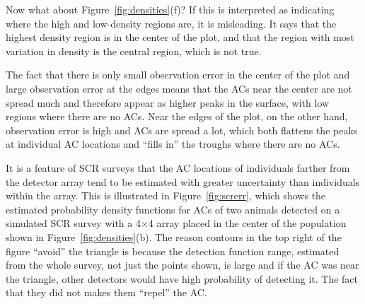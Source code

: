 \documentclass[useAMS,usenatbib,referee]{biom}
\begin{document}
Now what about Figure~\ref{fig:densities}(f)? If this is interpreted as indicating where the high and low-density regions are, it is misleading. It says that the highest density region is in the center of the plot, and that the region with most variation in density is the central region, which is not true. 

The fact that there is only small observation error in the center of the plot and large observation error at the edges means that the ACs near the center are not spread much and therefore appear as higher peaks in the surface, with low regions where there are no ACs. Near the edges of the plot, on the other hand, observation error is high and ACs are spread a lot, which both flattens the peaks at individual AC locations and ``fills in'' the troughs where there are no ACs. %


It is a feature of SCR surveys that the AC locations of individuals farther from the detector array tend to be estimated with greater uncertainty than individuals within the array. This is illustrated in Figure~\ref{fig:screrr}, which shows the estimated probability density functions for ACs of two animals detected on a simulated SCR survey with a 4$\times$4 array placed in the center of the population shown in Figure~\ref{fig:densities}(b). The reason contours in the top right of the figure ``avoid'' the triangle is because the detection function range, estimated from the whole survey, not just the points shown, is large and if the AC was near the triangle, other detectors would have high probability of detecting it. The fact that they did not makes them ``repel'' the AC. %
\end{document}
